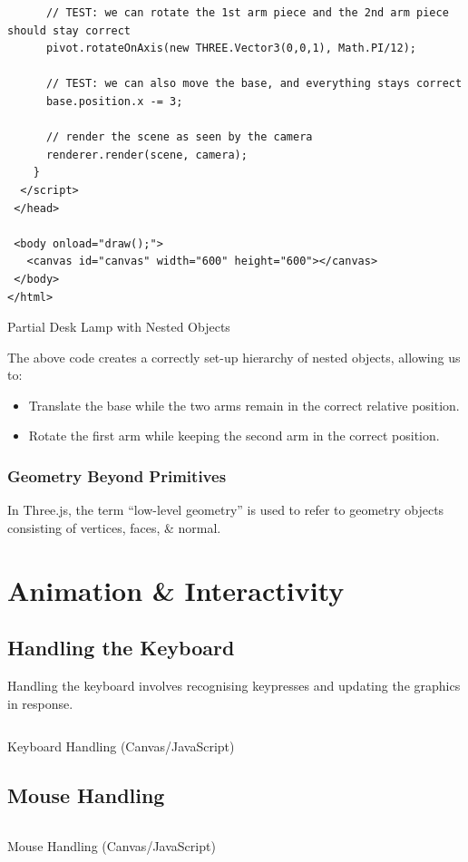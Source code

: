 \documentclass[a4paper,11pt]{article}
\newenvironment{code}{\captionsetup{type=listing}}{}
\begin{document}
\begin{code}
\begin{verbatim}
      // TEST: we can rotate the 1st arm piece and the 2nd arm piece should stay correct
      pivot.rotateOnAxis(new THREE.Vector3(0,0,1), Math.PI/12);

      // TEST: we can also move the base, and everything stays correct
      base.position.x -= 3;
      
      // render the scene as seen by the camera
      renderer.render(scene, camera);
    }
  </script>
 </head>

 <body onload="draw();">
   <canvas id="canvas" width="600" height="600"></canvas>
 </body>
</html>
\end{verbatim}
\caption{Partial Desk Lamp with Nested Objects}
\end{code}

The above code creates a correctly set-up hierarchy of nested objects, allowing us to:
\begin{itemize}
    \item   Translate the base while the two arms remain in the correct relative position.
    \item   Rotate the first arm while keeping the second arm in the correct position.
\end{itemize}

\subsubsection{Geometry Beyond Primitives}
In Three.js, the term ``low-level geometry'' is used to refer to geometry objects consisting of vertices, faces, \& 
normal.

\section{Animation \& Interactivity}
\subsection{Handling the Keyboard}
Handling the keyboard involves recognising keypresses and updating the graphics in response.

\begin{code}
    \inputminted[linenos, breaklines, frame=single]{html}{../materials/week3/examples/canvasWithKeyboardExample.html}
    \caption{Keyboard Handling (Canvas/JavaScript)}
\end{code}

\subsection{Mouse Handling}
\begin{code}
    \inputminted[linenos, breaklines, frame=single]{html}{../materials/week3/examples/canvasWithMouseExample.html}
    \caption{Mouse Handling (Canvas/JavaScript)}
\end{code}
\end{document}
